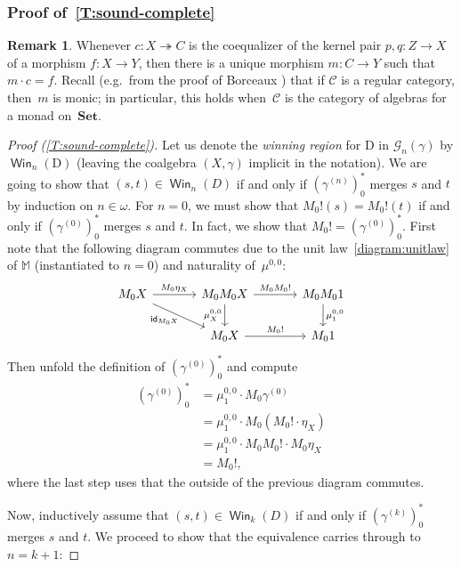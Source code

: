 \documentclass[sigconf,
			final%
			nonacm
                        ]{acmart}
\numberwithin{equation}{section}
\numberwithin{equation}{section}
\theoremstyle{plain}
\theoremstyle{definition}
\newtheorem{rem}[thm]{Remark}
\newcommand{\id}{\mathsf{id}}
\newcommand{\epito}{\twoheadrightarrow}
\newcommand{\M}{\mathbb{M}}                   %
\newcommand{\CatC}{\mathscr{C}}           %
\newcommand{\Set}{\mathbf{Set}}
\DeclareMathOperator{\Win}{\mathsf{Win}}
\newcommand{\CalG}{\mathcal{G}}             %
\begin{document}
\subsubsection*{Proof of~\cref{T:sound-complete}}
%
\begin{rem}\label{R:factorization}
  Whenever $c\colon X \epito C$ is the coequalizer of the kernel pair
  $p, q\colon Z\to X$ of a morphism $f\colon X\to Y$, then there is a
  unique morphism $m\colon C\to Y$ such that $m\cdot c = f$. Recall
  (e.g.~from the proof of Borceaux \cite[Thm.~2.1.3]{Borceux94}) that
  if $\CatC$ is a regular category, then~$m$ is monic; in particular,
  this holds when~$\CatC$ is the category of algebras for a monad
  on~$\Set$.
\end{rem}
%
\begin{proof}[Proof (\cref{T:sound-complete})]
  Let us denote the \emph{winning region} for D in $\CalG_n(\gamma)$ by
  $\Win_n(\text{D})$ (leaving the coalgebra $(X, \gamma)$ implicit in
  the notation).  We are going to show that $(s, t)\in\Win_n(D)$ if
  and only if $(\gamma^{(n)})^*_0$ merges $s$ and $t$ by induction on
  $n\in\omega$. For $n=0$, we must show that $M_0!(s)=M_0!(t)$ if and
  only if $(\gamma^{(0)})^*_0$ merges $s$ and $t$. In fact, we show
  that $M_0! = (\gamma^{(0)})^*_0$. First note that the following
  diagram commutes due to the unit law~\eqref{diagram:unitlaw} of $\M$
  (instantiated to $n=0$) and naturality of~$\mu^{0,0}$:
\[
\begin{tikzcd}[column sep = 35]
  M_0X \ar{rd}[swap,inner sep=0]{\id_{M_0X}} \arrow[r, "M_0\eta_X"]
  &
  M_0M_0X
  \arrow[r, "M_0M_0!"]
  \arrow[d, "{\mu^{0,0}_X}"']
  &
  M_0M_01
  \arrow[d, "{\mu^{0,0}_1}"]
  \\
  &
  M_0X \arrow[r, "M_0!"]
  &
  M_01
\end{tikzcd}
\]
Then unfold the definition of $(\gamma^{(0)})^*_0$ and compute
\begin{align*}
  (\gamma^{(0)})^*_0
  &= \mu^{0,0}_1\cdot M_0\gamma^{(0)}  \\
  &= \mu^{0,0}_1\cdot M_0(M_0!\cdot \eta_X)  \\		
  &= \mu^{0,0}_1\cdot M_0M_0!\cdot M_0\eta_X \\
  &= M_0!,
\end{align*}
where the last step uses that the outside of the previous diagram
commutes.

Now, inductively assume that $(s,t)\in\Win_{k}(D)$
if and only if $(\gamma^{(k)})^*_0$ merges $s$ and
$t$. We proceed to show that the equivalence carries
through to $n=k+1$:


\end{proof}
\end{document}
